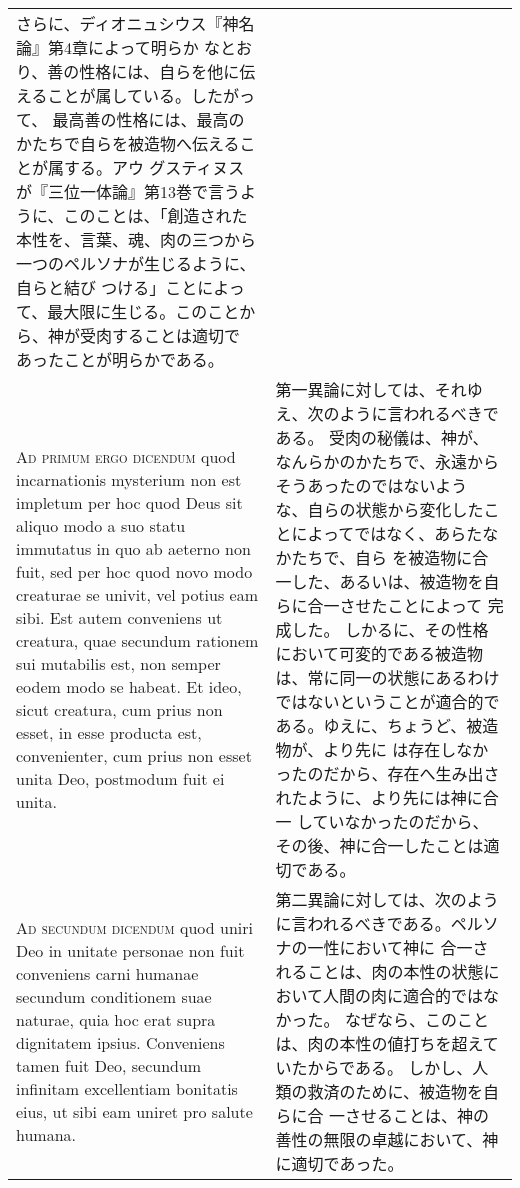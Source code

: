 \documentclass[10pt]{jsarticle} %
\begin{document}
\begin{longtable}{p{21em}p{21em}}
さらに、ディオニュシウス『神名論』第4章によって明らか
 なとおり、善の性格には、自らを他に伝えることが属している。したがって、
 最高善の性格には、最高のかたちで自らを被造物へ伝えることが属する。アウ
 グスティヌスが『三位一体論』第13巻で言うように、このことは、「創造された
 本性を、言葉、魂、肉の三つから一つのペルソナが生じるように、自らと結び
 つける」ことによって、最大限に生じる。このことから、神が受肉することは適切で
 あったことが明らかである。


\\

{\scshape Ad primum ergo dicendum} quod incarnationis mysterium non est impletum
per hoc quod Deus sit aliquo modo a suo statu immutatus in quo ab
aeterno non fuit, sed per hoc quod novo modo creaturae se univit, vel
potius eam sibi. Est autem conveniens ut creatura, quae secundum
rationem sui mutabilis est, non semper eodem modo se habeat. Et ideo,
sicut creatura, cum prius non esset, in esse producta est, convenienter,
cum prius non esset unita Deo, postmodum fuit ei unita.

&

第一異論に対しては、それゆえ、次のように言われるべきである。
受肉の秘儀は、神が、なんらかのかたちで、永遠からそうあったのではないよう
 な、自らの状態から変化したことによってではなく、あらたなかたちで、自ら
 を被造物に合一した、あるいは、被造物を自らに合一させたことによって
 完成した。
しかるに、その性格において可変的である被造物は、常に同一の状態にあるわけ
 ではないということが適合的である。ゆえに、ちょうど、被造物が、より先に
 は存在しなかったのだから、存在へ生み出されたように、より先には神に合一
 していなかったのだから、その後、神に合一したことは適切である。
\\

{\scshape Ad secundum dicendum} quod uniri Deo in unitate personae non fuit
conveniens carni humanae secundum conditionem suae naturae, quia hoc
erat supra dignitatem ipsius. Conveniens tamen fuit Deo, secundum
infinitam excellentiam bonitatis eius, ut sibi eam uniret pro salute
humana.

&

第二異論に対しては、次のように言われるべきである。ペルソナの一性において神に
 合一されることは、肉の本性の状態において人間の肉に適合的ではなかった。
 なぜなら、このことは、肉の本性の値打ちを超えていたからである。
しかし、人類の救済のために、被造物を自らに合
 一させることは、神の善性の無限の卓越において、神に適切であった。


\\


\end{longtable}
\end{document}
